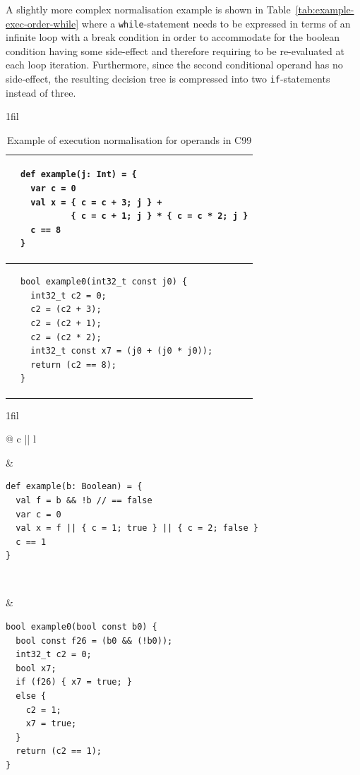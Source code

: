 \documentclass{article}
\makeatletter
\newcommand{\inlineC}[1]{\lstinline[language=C99]|#1|}
\newcommand{\inlineScala}[1]{\lstinline[language=MyScala]|#1|}
\newcommand{\vheading}[1]{\rotatebox[origin=c]{90}{~\textbf{#1}~}}
\newcommand*{\centerfloat}{%
  \parindent \z@
  \leftskip \z@ \@plus 1fil \@minus \textwidth
  \rightskip\leftskip
  \parfillskip \z@skip}
\makeatother
\begin{document}
A slightly more complex normalisation example is shown in
Table~\ref{tab:example-exec-order-while} where a \inlineScala{while}-statement
needs to be expressed in terms of an infinite loop with a break condition in
order to accommodate for the boolean condition having some side-effect and
therefore requiring to be re-evaluated at each loop iteration. Furthermore,
since the second conditional operand has no side-effect, the resulting decision
tree is compressed into two \inlineC{if}-statements instead of three.

\begin{table}[h]
  \centerfloat
  \begin{tabular}{@{} c || l}
    \toprule

    \vheading{Scala} &
    \begin{lstlisting}[language=MyScala]
def example(j: Int) = {
  var c = 0
  val x = { c = c + 3; j } +
          { c = c + 1; j } * { c = c * 2; j }
  c == 8
}
    \end{lstlisting} \\

    \midrule

    \vheading{C99} &
    \begin{lstlisting}[language=C99]
bool example0(int32_t const j0) {
  int32_t c2 = 0;
  c2 = (c2 + 3);
  c2 = (c2 + 1);
  c2 = (c2 * 2);
  int32_t const x7 = (j0 + (j0 * j0));
  return (c2 == 8);
}
    \end{lstlisting} \\

    \bottomrule
  \end{tabular}
  \caption{Example of execution normalisation for operands in C99}
  \label{tab:example-exec-order-operands}
\end{table}

\begin{table}[h]
  \centerfloat
  \begin{tabular}{@{} c || l}
    \toprule

    \vheading{Scala} &
    \begin{lstlisting}[language=MyScala]
def example(b: Boolean) = {
  val f = b && !b // == false
  var c = 0
  val x = f || { c = 1; true } || { c = 2; false }
  c == 1
}
    \end{lstlisting} \\

    \midrule

    \vheading{C99} &
    \begin{lstlisting}[language=C99]
bool example0(bool const b0) {
  bool const f26 = (b0 && (!b0));
  int32_t c2 = 0;
  bool x7;
  if (f26) { x7 = true; }
  else {
    c2 = 1;
    x7 = true;
  }
  return (c2 == 1);
}
    \end{lstlisting} \\

    \bottomrule
  \end{tabular}
  \caption{Example of execution normalisation with short-circuiting in C99}
  \label{tab:example-exec-order-short-circuiting}
\end{table}
\end{document}
